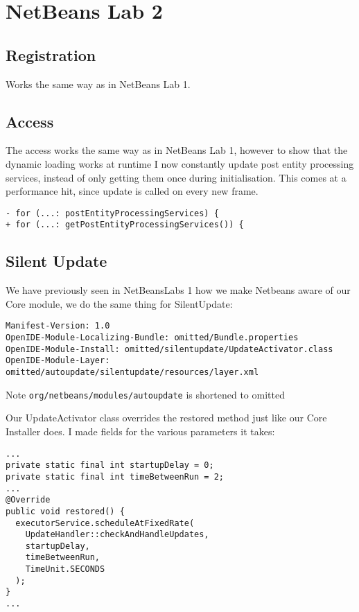 \section{NetBeans Lab 2}

\subsection{Registration}
Works the same way as in NetBeans Lab 1.

\subsection{Access}
The access works the same way as in NetBeans Lab 1, however to show that the dynamic
loading works at runtime I now constantly update post entity processing
services, instead of only getting them once during initialisation.
This comes at a performance hit, since update is called on every new frame.

\begin{verbatim}
- for (...: postEntityProcessingServices) {
+ for (...: getPostEntityProcessingServices()) {
\end{verbatim}

\subsection{Silent Update}
We have previously seen in NetBeansLabs 1 how we make Netbeans aware of our Core
module, we do the same thing for SilentUpdate:

\begin{verbatim}
Manifest-Version: 1.0
OpenIDE-Module-Localizing-Bundle: omitted/Bundle.properties
OpenIDE-Module-Install: omitted/silentupdate/UpdateActivator.class
OpenIDE-Module-Layer: omitted/autoupdate/silentupdate/resources/layer.xml
\end{verbatim}
Note \texttt{org/netbeans/modules/autoupdate} is shortened to omitted

Our UpdateActivator class overrides the restored method just like our Core
Installer does.
I made fields for the various parameters it takes:
\begin{verbatim}
...
private static final int startupDelay = 0;
private static final int timeBetweenRun = 2;
...
@Override
public void restored() {
  executorService.scheduleAtFixedRate(
    UpdateHandler::checkAndHandleUpdates,
    startupDelay,
    timeBetweenRun,
    TimeUnit.SECONDS
  );
}
...
\end{verbatim}


